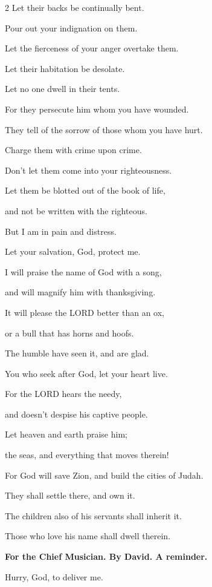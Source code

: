 \begin{multicols}{2}
	Let their backs be continually bent.
	
	
	\myverse{}Pour out your indignation on them.
	
	Let the fierceness of your anger overtake them.
	
	
	\myverse{}Let their habitation be desolate.
	
	Let no one dwell in their tents.
	
	
	\myverse{}For they persecute him whom you have wounded.
	
	They tell of the sorrow of those whom you have hurt.
	
	
	\myverse{}Charge them with crime upon crime.
	
	Don’t let them come into your righteousness.
	
	
	\myverse{}Let them be blotted out of the book of life,
	
	and not be written with the righteous.
	
	
	\myverse{}But I am in pain and distress.
	
	Let your salvation, God, protect me.
	
	
	\myverse{}I will praise the name of God with a song,
	
	and will magnify him with thanksgiving.
	
	
	\myverse{}It will please the LORD better than an ox,
	
	or a bull that has horns and hoofs.
	
	
	\myverse{}The humble have seen it, and are glad.
	
	You who seek after God, let your heart live.
	
	
	\myverse{}For the LORD hears the needy,
	
	and doesn’t despise his captive people.
	
	
	\myverse{}Let heaven and earth praise him;
	
	the seas, and everything that moves therein!
	
	
	\myverse{}For God will save Zion, and build the cities of Judah.
	
	They shall settle there, and own it.
	
	
	\myverse{}The children also of his servants shall inherit it.
	
	Those who love his name shall dwell therein.
	
	
	\mychapter{}\textbf{For the Chief Musician. By David. A reminder.}
	
	\quad \myverse*{}Hurry, God, to deliver me.
	

\end{multicols}
